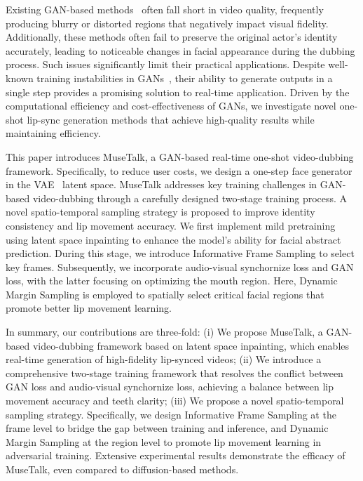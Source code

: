 Existing GAN-based methods~\cite{zhang2023dinet, cheng2022videoretalking, prajwal2020lip, wang2023seeing} often fall short in video quality, frequently producing blurry or distorted regions that negatively impact visual fidelity.
Additionally, these methods often fail to preserve the original actor's identity accurately, leading to noticeable changes in facial appearance during the dubbing process. 
Such issues significantly limit their practical applications. 
Despite well-known training instabilities in GANs~\cite{goodfellow2014generative, mescheder2018training}, their ability to generate outputs in a single step provides a promising solution to real-time application.
Driven by the computational efficiency and cost-effectiveness of GANs, we investigate novel one-shot lip-sync generation methods that achieve high-quality results while maintaining efficiency.

This paper introduces MuseTalk, a GAN-based real-time one-shot video-dubbing framework. 
Specifically, to reduce user costs, we design a one-step face generator in the VAE~\cite{kingma2013auto} latent space. 
MuseTalk addresses key training challenges in GAN-based video-dubbing through a carefully designed two-stage training process. 
A novel spatio-temporal sampling strategy is proposed to improve identity consistency and lip movement accuracy.
We first implement mild pretraining using latent space inpainting to enhance the model's ability for facial abstract prediction. 
During this stage, we introduce Informative Frame Sampling to select key frames.
Subsequently, we incorporate audio-visual synchornize loss and GAN loss, with the latter focusing on optimizing the mouth region. 
Here, Dynamic Margin Sampling is employed to spatially select critical facial regions that promote better lip movement learning.

In summary, our contributions are three-fold: 
(i) We propose MuseTalk, a GAN-based video-dubbing framework based on latent space inpainting, which enables real-time generation of high-fidelity lip-synced videos; 
(ii) We introduce a comprehensive two-stage training framework that resolves the conflict between GAN loss and audio-visual synchornize loss, achieving a balance between lip movement accuracy and teeth clarity; 
(iii) We propose a novel spatio-temporal sampling strategy. Specifically, we design Informative Frame Sampling at the frame level to bridge the gap between training and inference, and Dynamic Margin Sampling at the region level to promote lip movement learning in adversarial training. 
Extensive experimental results demonstrate the efficacy of MuseTalk, even compared to diffusion-based methods.